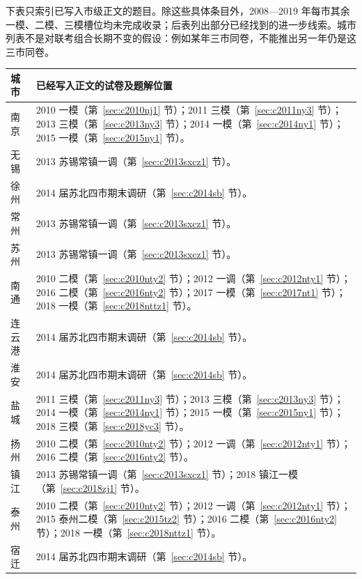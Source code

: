 \documentclass[UTF8,12pt,a4paper,fontset=fandol]{ctexart}
\begin{document}
下表只索引已写入市级正文的题目。除这些具体条目外，2008—2019 年每市其余一模、二模、三模槽位均未完成收录；后表列出部分已经找到的进一步线索。城市列表不是对联考组合长期不变的假设：例如某年三市同卷，不能推出另一年仍是这三市同卷。
\begin{longtable}{p{}p{}}
\textbf{城市}&\textbf{已经写入正文的试卷及题解位置}\\\hline
南京&2010 一模（第~\ref{sec:c2010nj1} 节）；2011 三模（第~\ref{sec:c2011ny3} 节）；2013 三模（第~\ref{sec:c2013ny3} 节）；2014 一模（第~\ref{sec:c2014ny1} 节）；2015 一模（第~\ref{sec:c2015ny1} 节）。\\
无锡&2013 苏锡常镇一调（第~\ref{sec:c2013sxcz1} 节）。\\
徐州&2014 届苏北四市期末调研（第~\ref{sec:c2014sb} 节）。\\
常州&2013 苏锡常镇一调（第~\ref{sec:c2013sxcz1} 节）。\\
苏州&2013 苏锡常镇一调（第~\ref{sec:c2013sxcz1} 节）。\\
南通&2010 二模（第~\ref{sec:c2010nty2} 节）；2012 一调（第~\ref{sec:c2012nty1} 节）；2016 二模（第~\ref{sec:c2016nty2} 节）；2017 一模（第~\ref{sec:c2017nt1} 节）；2018 一模（第~\ref{sec:c2018nttz1} 节）。\\
连云港&2014 届苏北四市期末调研（第~\ref{sec:c2014sb} 节）。\\
淮安&2014 届苏北四市期末调研（第~\ref{sec:c2014sb} 节）。\\
盐城&2011 三模（第~\ref{sec:c2011ny3} 节）；2013 三模（第~\ref{sec:c2013ny3} 节）；2014 一模（第~\ref{sec:c2014ny1} 节）；2015 一模（第~\ref{sec:c2015ny1} 节）；2018 三模（第~\ref{sec:c2018yc3} 节）。\\
扬州&2010 二模（第~\ref{sec:c2010nty2} 节）；2012 一调（第~\ref{sec:c2012nty1} 节）；2016 二模（第~\ref{sec:c2016nty2} 节）。\\
镇江&2013 苏锡常镇一调（第~\ref{sec:c2013sxcz1} 节）；2018 镇江一模（第~\ref{sec:c2018zj1} 节）。\\
泰州&2010 二模（第~\ref{sec:c2010nty2} 节）；2012 一调（第~\ref{sec:c2012nty1} 节）；2015 泰州二模（第~\ref{sec:c2015tz2} 节）；2016 二模（第~\ref{sec:c2016nty2} 节）；2018 一模（第~\ref{sec:c2018nttz1} 节）。\\
宿迁&2014 届苏北四市期末调研（第~\ref{sec:c2014sb} 节）。\\\hline
\end{longtable}
\end{document}
